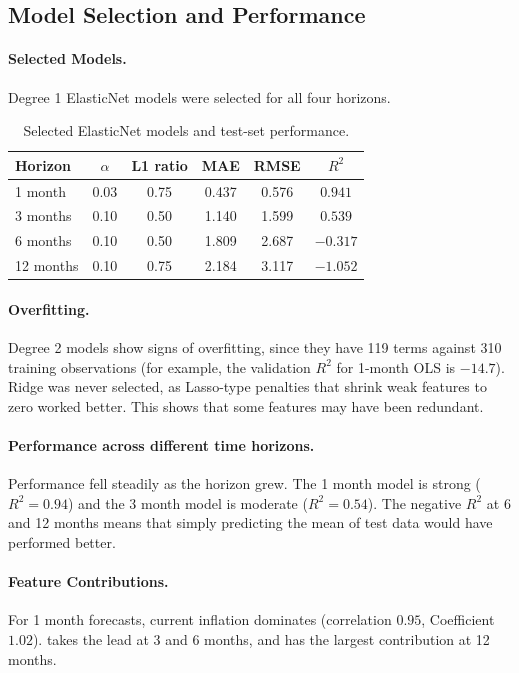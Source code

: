 \documentclass{article}
\begin{document}
\subsection{Model Selection and Performance}

\paragraph{Selected Models.}
Degree 1 ElasticNet models were selected for all four horizons.

\begin{table}[h]
\centering
\caption{Selected ElasticNet models and test-set performance.}
\label{tab:results}
\begin{tabular}{lccccc}
\toprule
Horizon & $\alpha$ & L1 ratio & MAE & RMSE & $R^2$ \\
\midrule
1 month   & 0.03 & 0.75 & 0.437 & 0.576 & $0.941$ \\
3 months  & 0.10 & 0.50 & 1.140 & 1.599 & $0.539$ \\
6 months  & 0.10 & 0.50 & 1.809 & 2.687 & $-0.317$ \\
12 months & 0.10 & 0.75 & 2.184 & 3.117 & $-1.052$ \\
\bottomrule
\end{tabular}
\end{table}

\paragraph{Overfitting.}
Degree 2 models show signs of overfitting, since they have 119 terms against 310 training
observations (for example, the validation $R^2$ for 1-month OLS is $-14.7$).
Ridge was never selected, as Lasso-type penalties that shrink weak features to
zero worked better. This shows that some features may have been redundant.

\paragraph{Performance across different time horizons.}
Performance fell steadily as the horizon grew. The 1 month model is strong
($R^2 = 0.94$) and the 3 month model is moderate ($R^2 = 0.54$). The negative
$R^2$ at 6 and 12 months means that simply predicting the mean of test data would
have performed better. 
\paragraph{Feature Contributions.}
For 1 month forecasts, current inflation dominates (correlation $0.95$, 
Coefficient $1.02$).  takes the lead at 3 and 6 months, and
 has the largest contribution at 12 months. 
\end{document}
